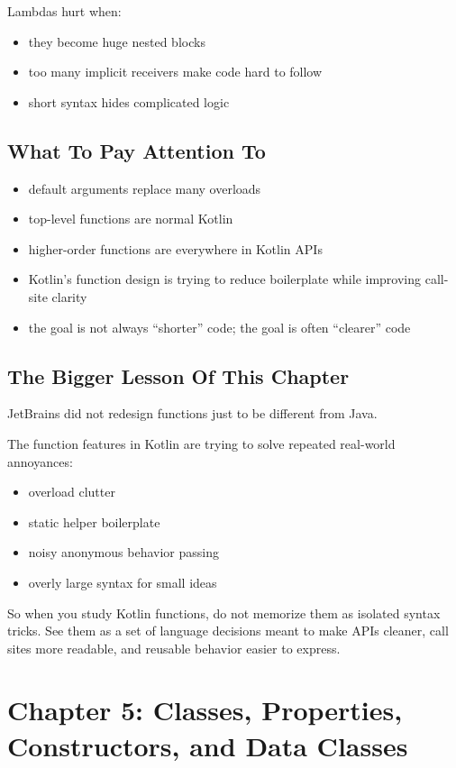 \documentclass[11pt,a4paper]{article}
\begin{document}
Lambdas hurt when:
\begin{itemize}
    \item they become huge nested blocks
    \item too many implicit receivers make code hard to follow
    \item short syntax hides complicated logic
\end{itemize}

\subsection{What To Pay Attention To}

\begin{itemize}
    \item default arguments replace many overloads
    \item top-level functions are normal Kotlin
    \item higher-order functions are everywhere in Kotlin APIs
    \item Kotlin's function design is trying to reduce boilerplate while improving call-site clarity
    \item the goal is not always ``shorter'' code; the goal is often ``clearer'' code
\end{itemize}

\subsection{The Bigger Lesson Of This Chapter}

JetBrains did not redesign functions just to be different from Java.

The function features in Kotlin are trying to solve repeated real-world annoyances:
\begin{itemize}
    \item overload clutter
    \item static helper boilerplate
    \item noisy anonymous behavior passing
    \item overly large syntax for small ideas
\end{itemize}

So when you study Kotlin functions, do not memorize them as isolated syntax tricks.
See them as a set of language decisions meant to make APIs cleaner, call sites more readable, and reusable behavior easier to express.

\section{Chapter 5: Classes, Properties, Constructors, and Data Classes}
\end{document}
